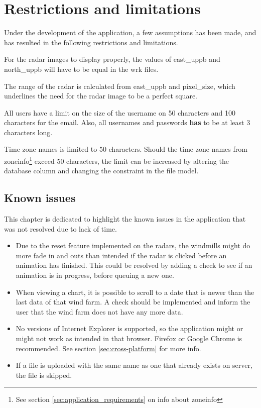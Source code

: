 \chapter{Restrictions and limitations}
Under the development of the application, a few assumptions has been made, and has resulted in the following restrictions and limitations.

For the radar images to display properly, the values of \textsf{east\_uppb} and \textsf{north\_uppb} will have to be equal in the \textsf{wrk} files.

The range of the radar is calculated from \textsf{east\_uppb} and \textsf{pixel\_size}, which underlines the need for the radar image to be a perfect square.

All users have a limit on the size of the username on 50 characters and 100 characters for the email.
Also, all usernames and passwords \textbf{has} to be at least 3 characters long.

Time zone names is limited to 50 characters. Should the time zone names from zoneinfo\footnote{See section \ref{sec:application_requirements} on info about zoneinfo} exceed 50 characters, the limit can be increased by altering the database column and changing the constraint in the file model.

\section{Known issues}
\label{sec:known_issues}
This chapter is dedicated to highlight the known issues in the application that was not resolved due to lack of time.
\begin{itemize}
\item Due to the reset feature implemented on the radars, the windmills might do more fade in and outs than intended if the radar is clicked before an animation has finished.
This could be resolved by adding a check to see if an animation is in progress, before queuing a new one.
\item When viewing a chart, it is possible to scroll to a date that is newer than the last data of that wind farm. A check should be implemented and inform the user that the wind farm does not have any more data.
\item No versions of Internet Explorer is supported, so the application might or might not work as intended in that browser. Firefox or Google Chrome is recommended. See section \ref{sec:cross-platform} for more info.
\item If a file is uploaded with the same name as one that already exists on server, the file is skipped.
\end{itemize}